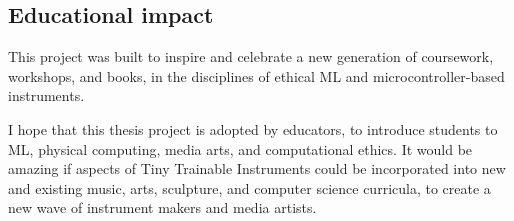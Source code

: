 \subsection{Educational impact}

This project was built to inspire and celebrate a new generation of coursework, workshops, and books, in the disciplines of ethical \acrshort{ML} and microcontroller-based instruments.

I hope that this thesis project is adopted by educators, to introduce students to \acrshort{ML}, physical computing, media arts, and computational ethics. It would be amazing if aspects of Tiny Trainable Instruments could be incorporated into new and existing music, arts, sculpture, and computer science curricula, to create a new wave of instrument makers and media artists.
